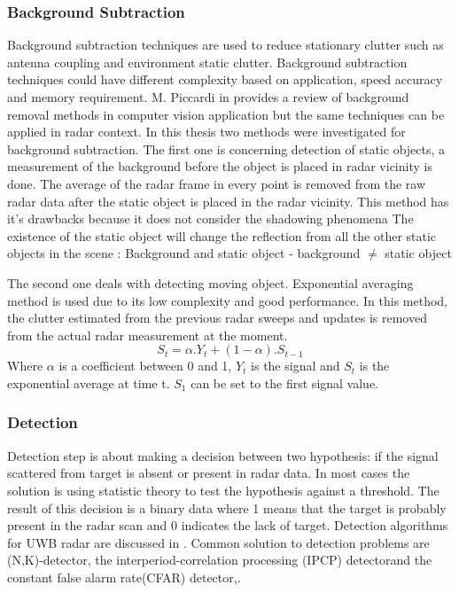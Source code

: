 \subsubsection{Background Subtraction}
Background subtraction techniques are used to reduce stationary clutter such as antenna coupling and environment static clutter. 
Background subtraction techniques could have different complexity based on application, speed accuracy and memory requirement. M. Piccardi in \cite{BackgroundsubtractionVision} provides a review of background removal methods in computer vision application but the same techniques can be applied in radar context. In this thesis two methods were investigated for background subtraction. The first one is concerning detection of static objects, a measurement of the background before the object is placed in radar vicinity is done. The average of the radar frame in every point is removed from the raw radar data after the static object is placed in the radar vicinity. This method has it's drawbacks because it does not consider the shadowing phenomena The existence of the static object will change the reflection from all the other static objects in the scene :
Background and static object - background $\neq$ static object

The second one deals with detecting moving object. Exponential averaging method is used due to its low complexity and good performance\cite{DetectionMsequenceZetik}. In this method, the clutter estimated from the previous radar sweeps and updates is removed from the actual radar measurement at the moment.
\begin{equation}
S_{t} =\alpha .Y_{t} + (1-\alpha).S_{t-1}
\end{equation}
Where $\alpha$ is a coefficient between 0 and 1, $Y_{t}$ is the signal and $S_{t}$ is the exponential average at time t. $S_{1}$ can be set to the first signal value. 

\subsubsection{Detection}
Detection step is about making a decision between two hypothesis: if the signal scattered from target is absent or present in radar data. In most cases the solution is using statistic theory to test the hypothesis against a threshold. The result of this decision is a binary data where 1 means that the target is probably present in the radar scan and 0 indicates the lack of target. Detection algorithms for UWB radar are discussed in \cite{taylor2000ultra}. Common solution to detection problems are (N,K)-detector\cite{NKDetector}, the interperiod-correlation processing (IPCP) detector\cite{IPCPdetector}and the constant
false alarm rate(CFAR) detector\cite{NezirovicDetectionTrappedVictims},\cite{CFARDetectionClutter}.

